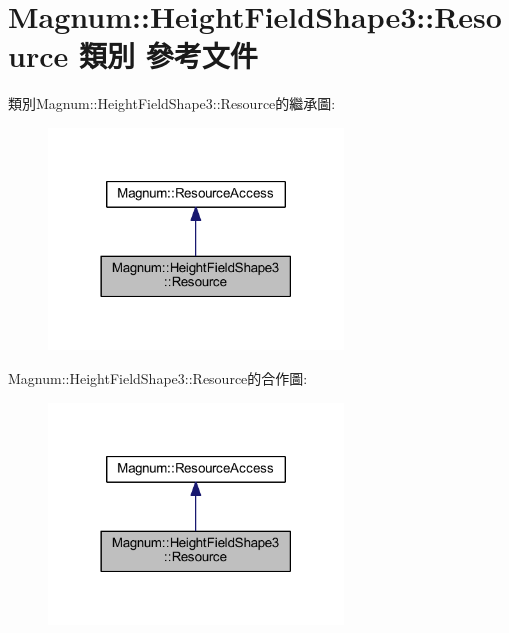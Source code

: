 \hypertarget{class_magnum_1_1_height_field_shape3_1_1_resource}{}\section{Magnum\+:\+:Height\+Field\+Shape3\+:\+:Resource 類別 參考文件}
\label{class_magnum_1_1_height_field_shape3_1_1_resource}


類別\+Magnum\+:\+:Height\+Field\+Shape3\+:\+:Resource的繼承圖\+:\nopagebreak
\begin{figure}[H]
\begin{center}
\leavevmode
\includegraphics[width=222pt]{class_magnum_1_1_height_field_shape3_1_1_resource__inherit__graph}
\end{center}
\end{figure}


Magnum\+:\+:Height\+Field\+Shape3\+:\+:Resource的合作圖\+:\nopagebreak
\begin{figure}[H]
\begin{center}
\leavevmode
\includegraphics[width=222pt]{class_magnum_1_1_height_field_shape3_1_1_resource__coll__graph}
\end{center}
\end{figure}
